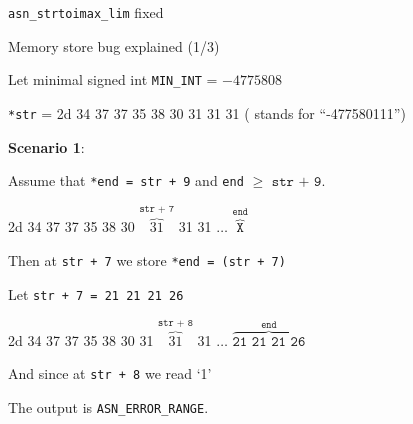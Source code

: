 \documentclass[10pt,usenames,dvipsnames,landscape]{beamer}
\begin{document}
\begin{frame}{\texttt{asn\_strtoimax\_lim} fixed}
  
    {\fontsize{6}{2}\selectfont }

\end{frame}
  

\begin{frame}{Memory store bug explained (1/3)}

    Let minimal signed int \texttt{MIN\_INT} = $-4775808$ 

    \texttt{*str} = {\color{red}2d 34 37 37 35 38 30 31 31 31} ( stands for ``-477580111'') 

   {\bf Scenario 1}:

    Assume that \texttt{*end = str + 9} and \texttt{end} $\geq$ $\texttt{str + 9}$.

     {\color{red}2d 34 37 37 35 38 30 {\color{blue}$\overbrace{31}^{\texttt{str + 7}}$} 31 31 $\ldots$ $\overbrace{\texttt{X}}^{\texttt{end}}$}

     Then at \texttt{str + 7} we store \texttt{*end = (str + 7)}

     Let \texttt{str + 7 = 21 21 21 26} 

     {\color{red}2d 34 37 37 35 38 30 31 {\color{blue} $\overbrace{31}^{\texttt{str + 8}}$} 31  $\ldots$ $\overbrace{\texttt{21 21 21 26}}^{\texttt{end}}$}
     
     And since at \texttt{str + 8} we read `1'
     

     
     The output is  \color{green}\texttt{ASN\_ERROR\_RANGE}.


  \end{frame}
\end{document}
